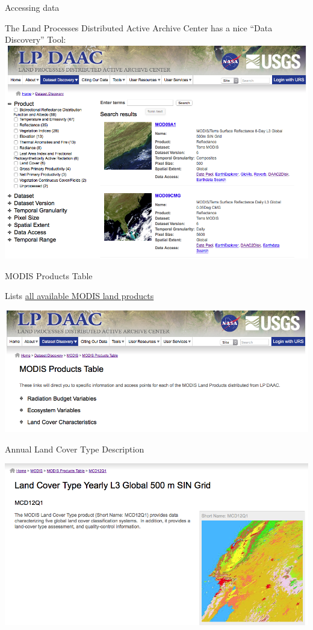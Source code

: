 \documentclass[ignorenonframetext,]{beamer}
\begin{document}
\begin{frame}{Accessing data}

The Land Processes Distributed Active Archive Center has a nice ``Data
Discovery'' Tool: \includegraphics{assets/lpdaac.png}

\end{frame}

\begin{frame}{MODIS Products Table}

Lists \href{}{all available MODIS land products}

\includegraphics{assets/lpdaac1.png}

\end{frame}

\begin{frame}{Annual Land Cover Type Description}

\includegraphics{assets/lpdaac2.png}

\end{frame}
\end{document}
